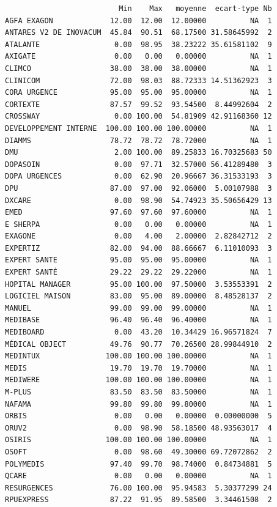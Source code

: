 \documentclass[]{article}
\begin{document}
\begin{verbatim}
                          Min    Max   moyenne  ecart-type Nb
AGFA EXAGON             12.00  12.00  12.00000          NA  1
ANTARES V2 DE INOVACUM  45.84  90.51  68.17500 31.58645992  2
ATALANTE                 0.00  98.95  38.23222 35.61581102  9
AXIGATE                  0.00   0.00   0.00000          NA  1
CLIMCO                  38.00  38.00  38.00000          NA  1
CLINICOM                72.00  98.03  88.72333 14.51362923  3
CORA URGENCE            95.00  95.00  95.00000          NA  1
CORTEXTE                87.57  99.52  93.54500  8.44992604  2
CROSSWAY                 0.00 100.00  54.81909 42.91168360 12
DEVELOPPEMENT INTERNE  100.00 100.00 100.00000          NA  1
DIAMMS                  78.72  78.72  78.72000          NA  1
DMU                      2.00 100.00  89.25833 16.70325683 50
DOPASOIN                 0.00  97.71  32.57000 56.41289480  3
DOPA URGENCES            0.00  62.90  20.96667 36.31533193  3
DPU                     87.00  97.00  92.06000  5.00107988  3
DXCARE                   0.00  98.90  54.74923 35.50656429 13
EMED                    97.60  97.60  97.60000          NA  1
E SHERPA                 0.00   0.00   0.00000          NA  1
EXAGONE                  0.00   4.00   2.00000  2.82842712  2
EXPERTIZ                82.00  94.00  88.66667  6.11010093  3
EXPERT SANTE            95.00  95.00  95.00000          NA  1
EXPERT SANTÉ            29.22  29.22  29.22000          NA  1
HOPITAL MANAGER         95.00 100.00  97.50000  3.53553391  2
LOGICIEL MAISON         83.00  95.00  89.00000  8.48528137  2
MANUEL                  99.00  99.00  99.00000          NA  1
MEDIBASE                96.40  96.40  96.40000          NA  1
MEDIBOARD                0.00  43.20  10.34429 16.96571824  7
MÉDICAL OBJECT          49.76  90.77  70.26500 28.99844910  2
MEDINTUX               100.00 100.00 100.00000          NA  1
MEDIS                   19.70  19.70  19.70000          NA  1
MEDIWERE               100.00 100.00 100.00000          NA  1
M-PLUS                  83.50  83.50  83.50000          NA  1
NAFAMA                  99.80  99.80  99.80000          NA  1
ORBIS                    0.00   0.00   0.00000  0.00000000  5
ORUV2                    0.00  98.90  58.18500 48.93563017  4
OSIRIS                 100.00 100.00 100.00000          NA  1
OSOFT                    0.00  98.60  49.30000 69.72072862  2
POLYMEDIS               97.40  99.70  98.74000  0.84734881  5
QCARE                    0.00   0.00   0.00000          NA  1
RESURGENCES             76.00 100.00  95.94583  5.30377299 24
RPUEXPRESS              87.22  91.95  89.58500  3.34461508  2

\end{verbatim}
\end{document}

